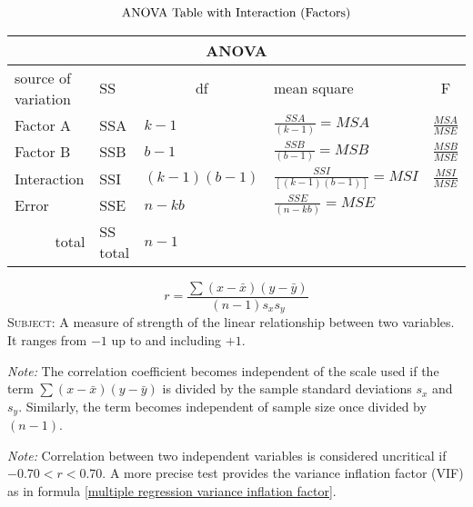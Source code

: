 \newpage
\cleardoublepage


 \\
\begin{equation}
\label{anova table two-way}
\centering \text{ANOVA Table with Interaction (Factors)}
\end{equation}
\begin{table}[!h] %
 \begin{footnotesize} %
 \begin{tabular}{@{}lllll@{}}
 \toprule
 \multicolumn{5}{c}{ANOVA} \\
 \midrule
 source of variation & \multicolumn{1}{l}{SS} & \multicolumn{1}{c}{df} & \multicolumn{1}{l}{mean square} & \multicolumn{1}{c}{F} \\
 \midrule
 Factor A  & SSA & $k-1$ & $\frac{SSA}{(k-1)}=MSA$ & $\frac{MSA}{MSE}$ \\
 Factor B & SSB & $b-1$ & $\frac{SSB}{(b-1)}=MSB$ & $\frac{MSB}{MSE}$ \\
 Interaction & SSI & $(k-1)(b-1)$ & $\frac{SSI}{[(k-1)(b-1)]}=MSI$ & $\frac{MSI}{MSE}$ \\
 Error & SSE & $n-kb$ & $\frac{SSE}{(n-kb)} = MSE$ &  \\
 \multicolumn{1}{r}{total} & SS total  & $n - 1$ &  & 
 \end{tabular}
 \end{footnotesize}
\end{table}
\hformbar

\newpage
\cleardoublepage


\begin{equation}
\label{correlation coefficient}
r = \frac{\sum(x-\bar{x})(y-\bar{y})}{(n-1)s_{x}s_{y}}
\end{equation}
\textsc{Subject:} A measure of strength of the linear relationship between two variables. It ranges from $-1$ up to and including $+1$.

\textit{Note:} The correlation coefficient becomes independent of the scale used if the term $\sum(x-\bar{x})(y-\bar{y})$ is divided by the sample standard deviations $s_{x}$ and $s_{y}$. Similarly, the term becomes independent of sample size once divided by $(n-1)$. 

\textit{Note:} Correlation between two independent variables is considered uncritical if $-0.70 < r < 0.70$. A more precise test provides the variance inflation factor (VIF) as in formula \eqref{multiple regression variance inflation factor}.

